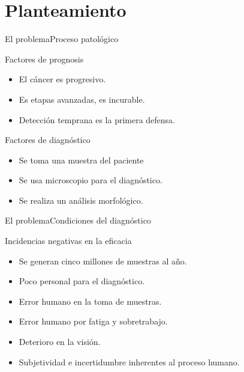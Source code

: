 \documentclass{beamer}
\begin{document}
    \section{Planteamiento}
    \begin{frame}{El problema}{Proceso patológico}

        \begin{block}{Factores de prognosis}
            {
                \begin{itemize}
                    \item El cáncer es progresivo.
                    \item Es etapas avanzadas, es incurable.
                    \item Detección temprana es la primera defensa.
                \end{itemize}
            }
        \end{block}

        \begin{exampleblock}{Factores de diagnóstico}
            {
                \begin{itemize}
                    \item Se toma una muestra del paciente
                    \item Se usa microscopio para el diagnóstico.
                    \item Se realiza un análisis morfológico.
                \end{itemize}
            }
        \end{exampleblock}
    \end{frame}

    \begin{frame}{El problema}{Condiciones del diagnóstico}
        
        \begin{alertblock}{Incidencias negativas en la eficacia}{
            \begin{itemize}
                \item Se generan cinco millones de muestras al año.
                \item Poco personal para el diagnóstico.
                \item Error humano en la toma de muestras.
                \item Error humano por fatiga y sobretrabajo.
                \item Deterioro en la visión.
                \item Subjetividad e incertidumbre inherentes al proceso humano.
            \end{itemize}
        }
        \end{alertblock}
    \end{frame}
\end{document}

